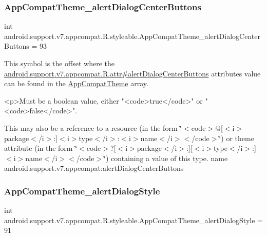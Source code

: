 \subsubsection{\texorpdfstring{App\+Compat\+Theme\+\_\+alert\+Dialog\+Center\+Buttons}{AppCompatTheme\_alertDialogCenterButtons}}
{\footnotesize\ttfamily int android.\+support.\+v7.\+appcompat.\+R.\+styleable.\+App\+Compat\+Theme\+\_\+alert\+Dialog\+Center\+Buttons = 93\hspace{0.3cm}{\ttfamily [static]}}

This symbol is the offset where the \hyperlink{classandroid_1_1support_1_1v7_1_1appcompat_1_1R_1_1attr_a660258c26951fc3dae1b71e792e182ce}{android.\+support.\+v7.\+appcompat.\+R.\+attr\#alert\+Dialog\+Center\+Buttons} attribute\textquotesingle{}s value can be found in the \hyperlink{classandroid_1_1support_1_1v7_1_1appcompat_1_1R_1_1styleable_a5c42f89e8a410c323be34208d75c430b}{App\+Compat\+Theme} array.

\begin{DoxyVerb}      <p>Must be a boolean value, either "<code>true</code>" or "<code>false</code>".
\end{DoxyVerb}
 

This may also be a reference to a resource (in the form \char`\"{}$<$code$>$@\mbox{[}$<$i$>$package$<$/i$>$\+:\mbox{]}$<$i$>$type$<$/i$>$\+:$<$i$>$name$<$/i$>$$<$/code$>$\char`\"{}) or theme attribute (in the form \char`\"{}$<$code$>$?\mbox{[}$<$i$>$package$<$/i$>$\+:\mbox{]}\mbox{[}$<$i$>$type$<$/i$>$\+:\mbox{]}$<$i$>$name$<$/i$>$$<$/code$>$\char`\"{}) containing a value of this type.  name android.\+support.\+v7.\+appcompat\+:alert\+Dialog\+Center\+Buttons \mbox{\label{classandroid_1_1support_1_1v7_1_1appcompat_1_1R_1_1styleable_a543b853df6b700874bf0296f96f96e72}} 
\subsubsection{\texorpdfstring{App\+Compat\+Theme\+\_\+alert\+Dialog\+Style}{AppCompatTheme\_alertDialogStyle}}
{\footnotesize\ttfamily int android.\+support.\+v7.\+appcompat.\+R.\+styleable.\+App\+Compat\+Theme\+\_\+alert\+Dialog\+Style = 91\hspace{0.3cm}{\ttfamily [static]}}

